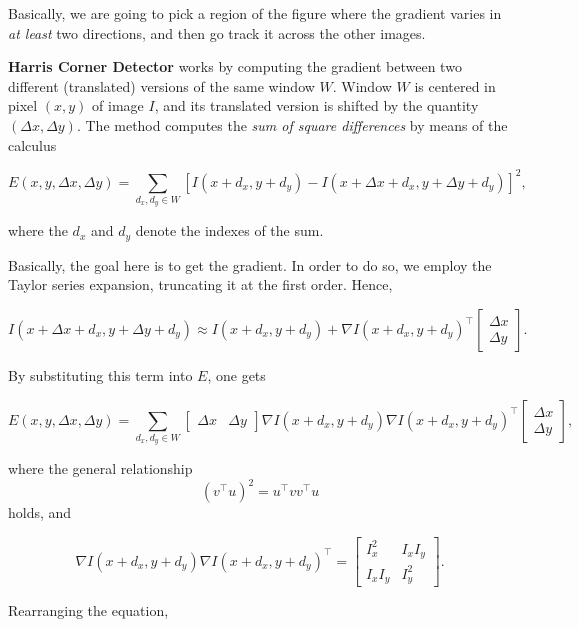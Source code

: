 \documentclass[10pt]{report}
\begin{document}
Basically, we are going to pick a region of the figure where the
gradient varies in \emph{at least} two directions, and then go track it
across the other images.

\textbf{Harris Corner Detector} works by computing the gradient between two
different (translated) versions of the same window \(W\). Window \(W\)
is centered in pixel \((x, y)\) of image \(I\), and its translated
version is shifted by the quantity \((\Delta x, \Delta y)\). The method
computes the \emph{sum of square differences} by means of the calculus

\[E(x, y, \Delta x, \Delta y) = \sum_{d_x, d_y \in W} [I(x + d_x, y + d_y) - I(x + \Delta x + d_x, y + \Delta y + d_y)]^2,\]

where the \(d_x\) and \(d_y\) denote the indexes of the sum.

Basically, the goal here is to get the gradient. In order to do so, we
employ the Taylor series expansion, truncating it at the first order.
Hence,

\[I(x + \Delta x + d_x, y + \Delta y + d_y) \approx I(x + d_x, y + d_y) + \nabla I(x + d_x, y + d_y)^\top \begin{bmatrix} \Delta x \\ \Delta y \end{bmatrix}.\]

By substituting this term into \(E\), one gets

\[E(x, y, \Delta x, \Delta y) = \sum_{d_x, d_y \in W} \begin{bmatrix} \Delta x & \Delta y \end{bmatrix} \nabla I(x + d_x, y + d_y) \nabla I(x + d_x, y + d_y)^\top \begin{bmatrix} \Delta x \\ \Delta y \end{bmatrix},\]

where the general relationship \[(v^\top u)^2 = u^\top v v^\top u\]
holds, and

\[ \nabla I(x + d_x, y + d_y) \nabla I(x + d_x, y + d_y)^\top = \begin{bmatrix} I^2_x & I_x I_y \\ I_x I_y & I^2_y \end{bmatrix}.\]

Rearranging the equation,
\end{document}
